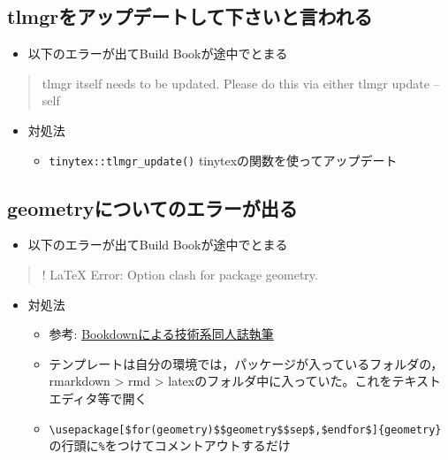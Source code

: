 \documentclass[xelatex,ja=standard]{bxjsbook}
\providecommand{\tightlist}{%
  \setlength{\itemsep}{0pt}\setlength{\parskip}{0pt}}
\begin{document}
\hypertarget{error_tlmgr}{%
\subsection{tlmgrをアップデートして下さいと言われる}\label{error_tlmgr}}

\begin{itemize}
\tightlist
\item
  以下のエラーが出てBuild Bookが途中でとまる
\end{itemize}

\begin{quote}
tlmgr itself needs to be updated.
Please do this via either
tlmgr update --self
\end{quote}

\begin{itemize}
\tightlist
\item
  対処法

  \begin{itemize}
  \tightlist
  \item
    \texttt{tinytex::tlmgr\_update()} tinytexの関数を使ってアップデート
  \end{itemize}
\end{itemize}

\hypertarget{error_pandoc}{%
\subsection{geometryについてのエラーが出る}\label{error_pandoc}}

\begin{itemize}
\tightlist
\item
  以下のエラーが出てBuild Bookが途中でとまる
\end{itemize}

\begin{quote}
! LaTeX Error: Option clash for package geometry.
\end{quote}

\begin{itemize}
\tightlist
\item
  対処法

  \begin{itemize}
  \tightlist
  \item
    参考: \href{https://teastat.blogspot.com/2019/01/bookdown.html}{Bookdownによる技術系同人誌執筆}
  \item
    テンプレートは自分の環境では，パッケージが入っているフォルダの，rmarkdown \textgreater{} rmd \textgreater{} latexのフォルダ中に入っていた。これをテキストエディタ等で開く
  \item
    \texttt{\textbackslash{}usepackage{[}\$for(geometry)\$\$geometry\$\$sep\$,\$endfor\${]}\{geometry\}}の行頭に\texttt{\%}をつけてコメントアウトするだけ
  \end{itemize}
\end{itemize}
\end{document}
